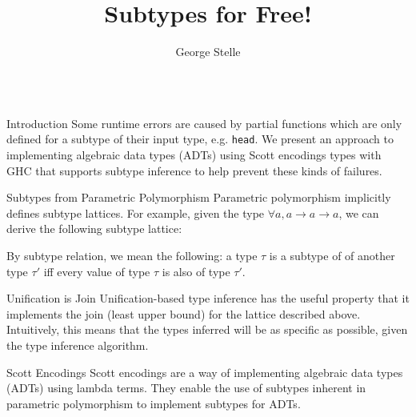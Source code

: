 \documentclass[final]{beamer}
\title{Subtypes for Free!}
\author{George Stelle}
\institute{University of New Mexico}
\begin{document}
\begin{frame}[fragile]
\begin{columns}[t]
\begin{column}{.285\textwidth}

\begin{block}{Introduction}
\vspace{0.5cm}
Some runtime errors are caused by partial functions which are only defined for a
subtype of their input type, e.g. \texttt{head}. We present an approach to
implementing algebraic data types (ADTs) using Scott encodings types with GHC
that supports subtype inference to help prevent these kinds of failures.
\end{block}
\vspace{2cm}
\begin{block}{Subtypes from Parametric Polymorphism}
\vspace{0.5cm}
Parametric polymorphism implicitly defines subtype lattices. For example, given
the type $\forall a, a \rightarrow a \rightarrow a$, we can derive the following
subtype lattice:
\vspace{0.5cm}
\begin{figure}[!h]
\centering
{}
\end{figure}
By subtype relation, we mean the following: a type $\tau$ is a subtype of of
another type $\tau'$ iff every value of type $\tau$ is also of type $\tau'$.
\end{block}
\vspace{2cm}
\begin{block}{Unification is Join}
\vspace{0.5cm}
Unification-based type inference has the useful property that it implements the
join (least upper bound) for the lattice described above. Intuitively, this
means that the types inferred will be as specific as possible, given the type
inference algorithm. 
\end{block}
\vspace{2cm}
\begin{block}{Scott Encodings}
\vspace{0.5cm}
Scott encodings are a way of implementing algebraic data types (ADTs) using
lambda terms. They enable the use of subtypes inherent in parametric
polymorphism to implement subtypes for ADTs. 
\end{block}
\end{column}


\end{columns}
\end{frame}
\end{document}
